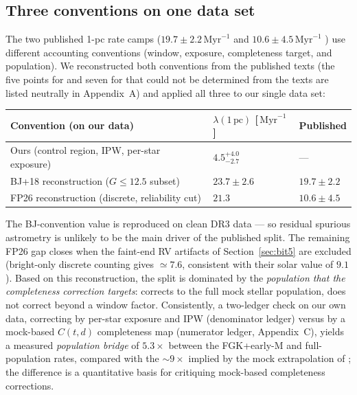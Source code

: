 \documentclass[11pt]{article}
\newcommand{\Myr}{\,\mathrm{Myr}}
\newcommand{\pc}{\,\mathrm{pc}}
\newcommand{\lam}{\lambda}
\begin{document}
\subsection{Three conventions on one data set}
The two published 1-pc rate camps ($19.7\pm2.2\Myr^{-1}$ \cite{bj18} and
$10.6\pm4.5\Myr^{-1}$ \cite{fp26}) use different accounting conventions
(window, exposure, completeness target, and population). We reconstructed
both conventions from the published texts (the five points for \cite{bj18}
and seven for \cite{fp26} that could not be determined from the texts are
listed neutrally in Appendix~A) and applied all three to our single data
set:

\begin{center}
\begin{tabular}{lll}
\toprule
Convention (on our data) & $\lam(1\pc)$ [$\Myr^{-1}$] & Published \\
\midrule
Ours (control region, IPW, per-star exposure) & $4.5^{+4.0}_{-2.7}$ & --- \\
BJ+18 reconstruction ($G\le12.5$ subset) & $23.7\pm2.6$ & $19.7\pm2.2$ \\
FP26 reconstruction (discrete, reliability cut) & $21.3$ & $10.6\pm4.5$ \\
\bottomrule
\end{tabular}
\end{center}

The BJ-convention value is reproduced on clean DR3 data --- so residual
spurious astrometry is unlikely to be the main driver of the published
split. The remaining FP26 gap closes when the faint-end RV artifacts of
Section~\ref{sec:bit5} are excluded (bright-only discrete counting gives
$\simeq7.6$, consistent with their solar value of $9.1$). Based on this
reconstruction, the split is dominated by the \emph{population that the
completeness correction targets}: \cite{bj18} corrects to the full mock
stellar population, \cite{fp26} does not correct beyond a window factor.
Consistently, a two-ledger check on our own data, correcting by
per-star exposure and IPW (denominator ledger) versus by a mock-based
$C(t,d)$ completeness map (numerator ledger, Appendix~C), yields a
measured \emph{population bridge} of $5.3\times$ between the FGK+early-M
and full-population rates, compared with the $\sim9\times$ implied by the
mock extrapolation of \cite{bj18}; the difference is a quantitative basis
for critiquing mock-based completeness corrections.
\end{document}
